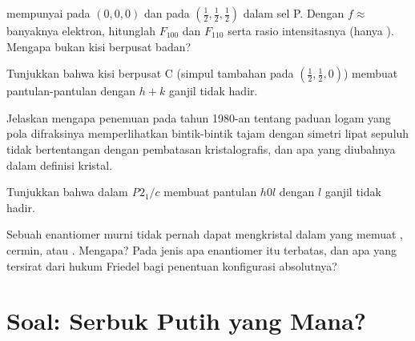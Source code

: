 \begin{exercise}[$\star\star$]\label{exo:b3:x-ray-diffraction:8}
 mempunyai  pada $(0,0,0)$ dan  pada $(\frac12,\frac12,\frac12)$
dalam sel P. Dengan $f
\approx$ banyaknya elektron, hitunglah $F_{100}$ dan $F_{110}$ serta rasio
intensitasnya (hanya ). Mengapa  bukan kisi
berpusat badan?
\end{exercise}

\begin{exercise}[$\star\star$]\label{exo:b3:x-ray-diffraction:9}
Tunjukkan bahwa kisi berpusat C (simpul tambahan pada $(\frac12,\frac12,0)$)
membuat pantulan-pantulan dengan $h + k$ ganjil tidak hadir.
\end{exercise}

\begin{exercise}[$\star\star\star$]\label{exo:b3:x-ray-diffraction:10}
Jelaskan mengapa penemuan pada tahun 1980-an tentang paduan logam yang pola
difraksinya memperlihatkan bintik-bintik tajam dengan simetri lipat sepuluh
tidak bertentangan dengan pembatasan kristalografis, dan apa yang diubahnya
dalam definisi kristal.
\end{exercise}

\begin{exercise}[$\star\star\star$]\label{exo:b3:x-ray-diffraction:11}
Tunjukkan bahwa dalam \textit{P}$2_1/c$  membuat pantulan $h0l$
dengan $l$ ganjil tidak hadir.
\end{exercise}

\begin{exercise}[$\star\star\star$]\label{exo:b3:x-ray-diffraction:12}
Sebuah enantiomer murni tidak pernah dapat mengkristal dalam  yang
memuat , cermin, atau . Mengapa? Pada jenis  apa enantiomer itu terbatas, dan apa yang tersirat dari hukum Friedel
bagi penentuan konfigurasi absolutnya?
\end{exercise}
\clearpage
\enlargethispage{3\baselineskip}
\section{Soal: Serbuk Putih yang Mana?}

